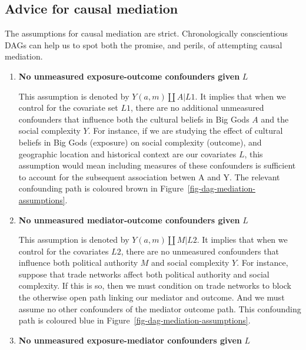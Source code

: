 \documentclass[
  singlecolumn]{report}
\begin{document}
\hypertarget{advice-for-causal-mediation}{%
\subsection{Advice for causal
mediation}\label{advice-for-causal-mediation}}

The assumptions for causal mediation are strict. Chronologically
conscientious DAGs can help us to spot both the promise, and perils, of
attempting causal mediation.

\begin{enumerate}
\def\labelenumi{\arabic{enumi}.}
\item
  \textbf{No unmeasured exposure-outcome confounders given} \(L\)

  This assumption is denoted by \(Y(a,m) \coprod A | L1\). It implies
  that when we control for the covariate set \(L1\), there are no
  additional unmeasured confounders that influence both the cultural
  beliefs in Big Gods \(A\) and the social complexity \(Y\). For
  instance, if we are studying the effect of cultural beliefs in Big
  Gods (exposure) on social complexity (outcome), and geographic
  location and historical context are our covariates \(L\), this
  assumption would mean including measures of these confounders is
  sufficient to account for the subsequent association betwen A and Y.
  The relevant confounding path is coloured brown in
  Figure~\ref{fig-dag-mediation-assumptions}.
\item
  \textbf{No unmeasured mediator-outcome confounders given} \(L\)

  This assumption is denoted by \(Y(a,m) \coprod M | L2\). It implies
  that when we control for the covariates \(L2\), there are no
  unmeasured confounders that influence both political authority \(M\)
  and social complexity \(Y\). For instance, suppose that trade networks
  affect both political authority and social complexity. If this is so,
  then we must condition on trade networks to block the otherwise open
  path linking our mediator and outcome. And we must assume no other
  confounders of the mediator outcome path. This confounding path is
  coloured blue in Figure~\ref{fig-dag-mediation-assumptions}.
\item
  \textbf{No unmeasured exposure-mediator confounders given} \(L\)


\end{enumerate}
\end{document}
